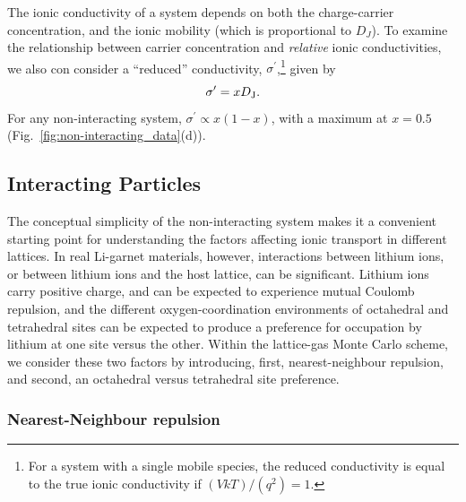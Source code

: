 \documentclass[aps,prb,twocolumn,superscriptaddress,reprint]{revtex4-1}
\begin{document}
The ionic conductivity of a system depends on both the charge-carrier concentration, and the ionic mobility (which is proportional to $D_J$). 
To examine the relationship between carrier concentration and \emph{relative} ionic conductivities, we also con consider a ``reduced'' conductivity, $\sigma^\prime$,\footnote{For a system with a single mobile species, the reduced conductivity is equal to the true ionic conductivity if $(VkT)/(q^2)=1$.} given by
\begin{equation}
  \sigma^\prime = xD_{\mathrm{J}}.
\end{equation}
For any non-interacting system, $\sigma^\prime\propto x\left(1-x\right)$, with a maximum at $x=0.5$ (Fig.~\ref{fig:non-interacting_data}(d)).

\subsection{Interacting Particles}

The conceptual simplicity of the non-interacting system makes it a convenient starting point for understanding the factors affecting ionic transport in different lattices. 
In real Li-garnet materials, however, interactions between lithium ions, or between lithium ions and the host lattice, can be significant. 
Lithium ions carry positive charge, and can be expected to experience mutual Coulomb repulsion, and the different oxygen-coordination environments of octahedral and tetrahedral sites can be expected to produce a preference for occupation by lithium at one site versus the other. 
Within the lattice-gas Monte Carlo scheme, we consider these two factors by introducing, first, nearest-neighbour repulsion, and second, an octahedral versus tetrahedral site preference.


\subsubsection{Nearest-Neighbour repulsion}
\end{document}
